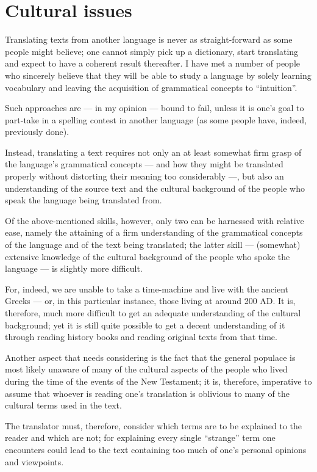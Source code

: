 \section*{Cultural issues}
  
 Translating texts from another language is never as straight-forward as some people might believe; one cannot simply pick up a dictionary, start translating and expect to have a coherent result thereafter. I have met a number of people who sincerely believe that they will be able to study a language by solely learning vocabulary and leaving the acquisition of grammatical concepts to ``intuition''. 
 
 Such approaches are — in my opinion — bound to fail, unless it is one's goal to part-take in a spelling contest in another language (as some people have, indeed, previously done). 
 
 Instead, translating a text requires not only an at least somewhat firm grasp of the language's grammatical concepts — and how they might be translated properly without distorting their meaning too considerably —, but also an understanding of the source text and the cultural background of the people who speak the language being translated from. 
 
 Of the above-mentioned skills, however, only two can be harnessed with relative ease, namely the attaining of a firm understanding of the grammatical concepts of the language and of the text being translated; the latter skill — (somewhat) extensive knowledge of the cultural background of the people who spoke the language — is slightly more difficult.
 
 For, indeed, we are unable to take a time-machine and live with the ancient Greeks — or, in this particular instance, those living at around 200 AD. It is, therefore, much more difficult to get an adequate understanding of the cultural background; yet it is still quite possible to get a decent understanding of it through reading history books and reading original texts from that time.
 
 Another aspect that needs considering is the fact that the general populace is most likely unaware of many of the cultural aspects of the people who lived during the time of the events of the New Testament; it is, therefore, imperative to assume that whoever is reading one's translation is oblivious to many of the cultural terms used in the text.  
 
 The translator must, therefore, consider which terms are to be explained to the reader and which are not; for explaining every single ``strange'' term one encounters could lead to the text containing too much of one's personal opinions and viewpoints. 
 

